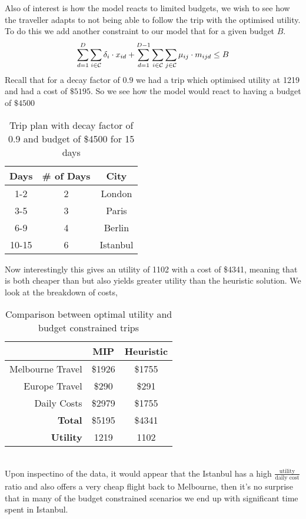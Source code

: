 \documentclass[a4paper]{article}
\begin{document}
Also of interest is how the model reacts to limited budgets, we wish to see how the traveller adapts to not being able to follow the trip with the optimised utility. To do this we add another constraint to our model that for a given budget $B$.
\begin{equation*}
	\sum_{d=1}^{D} \sum_{i \in \mathcal{C}} \delta_{i} \cdot x_{id} + \sum_{d=1}^{D-1} \sum_{i \in \mathcal{C}} \sum_{j \in \mathcal{C}} \mu_{ij} \cdot m_{ijd} \leq B\\
\end{equation*}
Recall that for a decay factor of $0.9$ we had a trip which optimised utility at 1219 and had a cost of $\$5195$. So we see how the model would react to having a budget of $\$4500$
\begin{table}[h]
\caption{Trip plan with decay factor of 0.9 and budget of \$4500 for 15 days}
\centering
\begin{tabular}{c|c|c}
	\hline
	\rule{0pt}{2ex} Days & \# of Days & City \\
	\hline
	1-2 & 2 & London \\
	3-5 & 3 & Paris \\
	6-9 & 4 & Berlin \\
	10-15 & 6 & Istanbul \\
	\hline
\end{tabular}
\vspace{1mm}
\end{table}
Now interestingly this gives an utility of 1102 with a cost of \$4341, meaning that is both cheaper than but also yields greater utility than the heuristic solution. We look at the breakdown of costs,
\begin{table}[h]
\caption{Comparison between optimal utility and budget constrained trips}
\centering
\begin{tabular}{r|c|c}
\hline
& MIP & Heuristic \\
\hline
Melbourne Travel & \$1926 & \$1755 \\
Europe Travel & \$290 & \$291 \\
Daily Costs & \$2979 & \$1755 \\
\hline
\hline
\textbf{Total} & \$5195 & \$4341 \\
\hline
\textbf{Utility} & 1219 & 1102 \\
\hline
\end{tabular}
\end{table} \\
Upon inspectino of the data, it would appear that the Istanbul has a high $\frac{\text{utility}}{\text{daily cost}}$ ratio and also offers a very cheap flight back to Melbourne, then it's no surprise that in many of the budget constrained scenarios we end up with significant time spent in Istanbul.
\end{document}
